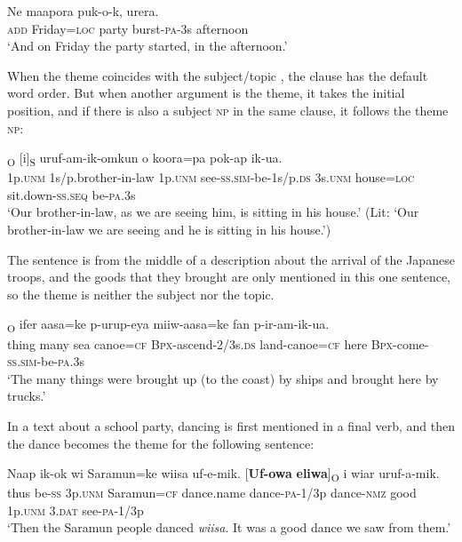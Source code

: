 \ea%
\label{ex:9:x1698}
\gll Ne    maapora  puk-o-k,  urera.  \\
\textsc{add}  Friday=\textsc{loc}  party  burst-\textsc{pa}-3s  afternoon      \\
\glt`And on Friday the party started, in the afternoon.'
\z


When the theme coincides with the subject/topic , the clause has the default word order. But when another argument is the theme, it takes the initial position, and if there is also a subject \textsc{np} in the same clause, it follows the theme  \textsc{np}: 

\ea%
\label{ex:9:x1473}
\textsubscript{O}  [i]\textsubscript{S}  uruf-am-ik-omkun o  koora=pa  pok-ap  ik-ua.\\
1p.\textsc{unm}  1s/p.brother-in-law  1p.\textsc{unm}  see-\textsc{ss}.\textsc{sim}-be-1s/p.\textsc{ds} 3s.\textsc{unm}  house=\textsc{loc}  sit.down-\textsc{ss}.\textsc{seq}  be-\textsc{pa}.3s\\
\glt`Our brother-in-law, as we are seeing him, is sitting in his house.' (Lit: `Our brother-in-law we are seeing and he is sitting in his house.')
\z
{}


The sentence  is from the middle of a description about the arrival of the Japanese troops, and the goods that they brought are only mentioned in this one sentence, so the theme is neither the subject nor the topic. 

\ea%
\label{ex:9:x1701}
\textsubscript{O}  ifer  aasa=ke  p-urup-eya miiw-aasa=ke  fan  p-ir-am-ik-ua. \\
thing  many  sea  canoe=\textsc{cf}  \textsc{Bpx}-ascend-2/3s.\textsc{ds} land-canoe=\textsc{cf}  here  \textsc{Bpx}-come-\textsc{ss}.\textsc{sim}-be-\textsc{pa}.3s     \\
\glt`The many things were brought up (to the coast) by ships and brought here by trucks.'
\z


In a text about a school party, dancing is first mentioned in a final verb, and then the dance becomes the theme for the following sentence:

\ea%
\label{ex:9:x1702}
\gll Naap  ik-ok  wi  Saramun=ke  wiisa  uf-e-mik. [\textbf{Uf-owa}  \textbf{eliwa}]\textsubscript{O}  i  wiar  uruf-a-mik. \\
thus  be-\textsc{ss}  3p.\textsc{unm}  Saramun=\textsc{cf}  dance.name  dance-\textsc{pa}-1/3p dance-\textsc{nmz}  good  1p.\textsc{unm}  3.\textsc{dat}  see-\textsc{pa}-1/3p     \\
\glt`Then the Saramun people danced \textit{wiisa}. It was a good dance we saw from them.'
\z



